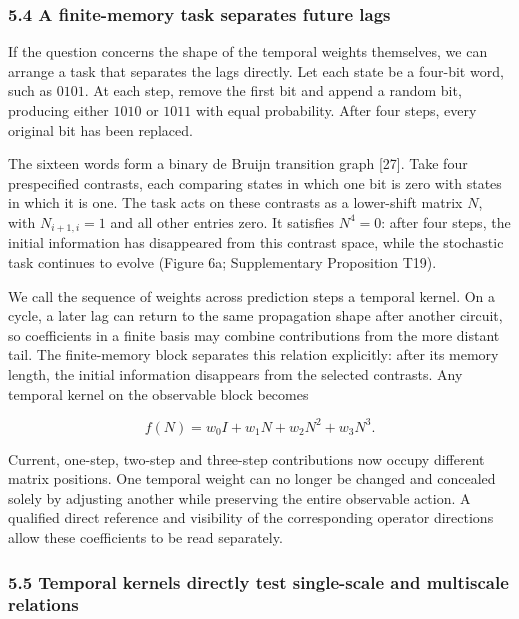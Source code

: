 \documentclass[11pt,a4paper]{article}
\begin{document}
\subsubsection{5.4 A finite-memory task separates future
lags}\label{a-finite-memory-task-separates-future-lags}

If the question concerns the shape of the temporal weights themselves,
we can arrange a task that separates the lags directly. Let each state
be a four-bit word, such as \(0101\). At each step, remove the first bit
and append a random bit, producing either \(1010\) or \(1011\) with
equal probability. After four steps, every original bit has been
replaced.

The sixteen words form a binary de Bruijn transition graph {[}27{]}.
Take four prespecified contrasts, each comparing states in which one bit
is zero with states in which it is one. The task acts on these contrasts
as a lower-shift matrix \(N\), with \(N_{i+1,i}=1\) and all other
entries zero. It satisfies \(N^4=0\): after four steps, the initial
information has disappeared from this contrast space, while the
stochastic task continues to evolve (Figure 6a; Supplementary
Proposition T19).

\par
\noindent\begin{minipage}{\linewidth}

We call the sequence of weights across prediction steps a temporal
kernel. On a cycle, a later lag can return to the same propagation shape
after another circuit, so coefficients in a finite basis may combine
contributions from the more distant tail. The finite-memory block
separates this relation explicitly: after its memory length, the initial
information disappears from the selected contrasts. Any temporal kernel
on the observable block becomes

\[
f(N)=w_0I+w_1N+w_2N^2+w_3N^3.
\]

\end{minipage}\par

Current, one-step, two-step and three-step contributions now occupy
different matrix positions. One temporal weight can no longer be changed
and concealed solely by adjusting another while preserving the entire
observable action. A qualified direct reference and visibility of the
corresponding operator directions allow these coefficients to be read
separately.

\subsubsection{5.5 Temporal kernels directly test single-scale and
multiscale
relations}\label{temporal-kernels-directly-test-single-scale-and-multiscale-relations}
\end{document}
